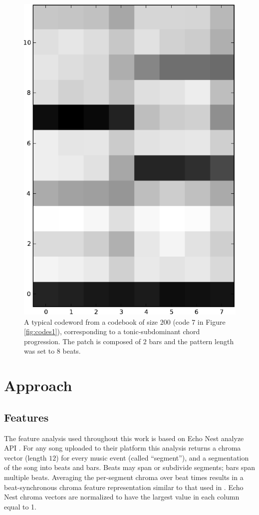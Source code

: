 \documentclass{article}
\begin{document}
\begin{figure}[t]
\begin{center}
\includegraphics[width=.4\columnwidth]{code}
\end{center}
\caption{\small{A typical codeword from a codebook of size $200$ (code
    7 in Figure \ref{fig:codes1}), corresponding to a
    tonic-subdominant chord progression.  The patch is composed of $2$
    bars and the pattern length was set to $8$ beats.  }}
\label{fig:code}
\end{figure}


\section{Approach}\label{sec:approach}

\subsection{Features}
The feature analysis used throughout this work is based on Echo Nest
analyze API \cite{EchoNest}.  
%
For any song uploaded to their platform this analysis returns a chroma
vector (length $12$) for every music event (called ``segment''), and a
segmentation of the song into beats and bars. Beats may span or 
subdivide segments; bars span multiple beats.
%
Averaging the per-segment chroma over beat times results in a
beat-synchronous chroma feature representation similar to that used in
\cite{Ellis2007a}.  Echo Nest chroma vectors are normalized to have the 
largest value in each column equal to 1.

\end{document}
